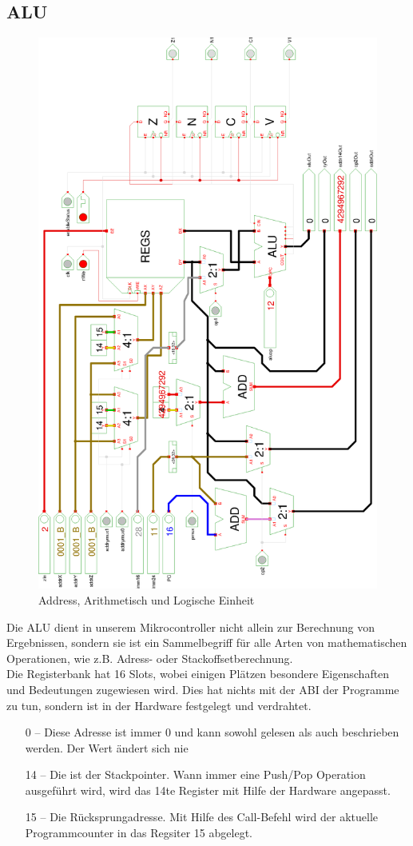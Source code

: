 \subsection{ALU}
\begin{figure}[hbt]
\centering
\includegraphics[width=.8\textwidth]{images/alu.eps}
\caption{\label{HW:ALU}Address, Arithmetisch und Logische Einheit}
\end{figure}
Die ALU dient in unserem Mikrocontroller nicht allein zur Berechnung von Ergebnissen, sondern sie ist ein Sammelbegriff für alle Arten von mathematischen Operationen, wie z.B. Adress- oder Stackoffsetberechnung.\\
Die Registerbank hat 16 Slots, wobei einigen Plätzen besondere Eigenschaften und Bedeutungen zugewiesen wird. Dies hat nichts mit der ABI der Programme zu tun, sondern ist in der Hardware festgelegt und verdrahtet.
\begin{itemize}
  \item[0 --] Diese Adresse ist immer 0 und kann sowohl gelesen als auch beschrieben werden. Der Wert ändert sich nie
  \item[14 --] Die ist der Stackpointer. Wann immer eine Push/Pop Operation ausgeführt wird, wird das 14te Register mit Hilfe der Hardware angepasst.
  \item[15 --] Die Rücksprungadresse. Mit Hilfe des Call-Befehl wird der aktuelle Programmcounter in das Regsiter 15 abgelegt.
\end{itemize}
